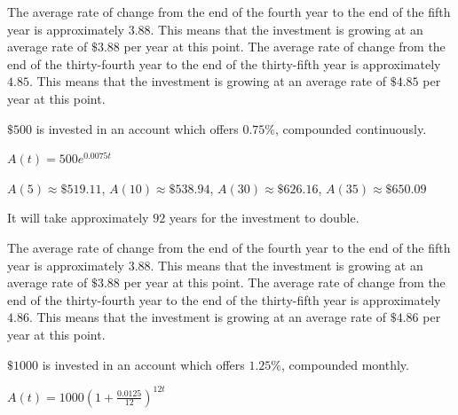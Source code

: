 \documentclass{ximera}
\begin{document}
\begin{question}
\begin{problem}
\begin{solution}
    The average rate of change from the end of the fourth year to the end of the fifth year is approximately $3.88$.  This means that the investment is growing at an average rate of $\$3.88$ per year at this point.  The average rate of change from the end of the thirty-fourth year to the end of the thirty-fifth year is approximately $4.85$.  This means that the investment is growing at an average rate of $\$4.85$ per year at this point. 
\end{solution}
    
\end{problem}

\begin{problem}
    $\$500$ is invested in an account which offers $0.75 \%$, compounded continuously.

\begin{solution}
    $A(t) = 500e^{0.0075t}$ 
\end{solution}

\begin{solution}
    $A(5) \approx \$ 519.11$, $A(10) \approx \$ 538.94$, $A(30) \approx \$ 626.16$, $A(35) \approx \$ 650.09$ 
\end{solution}

\begin{solution}
    It will take approximately $92$ years for the investment to double.
\end{solution}

\begin{solution}
    The average rate of change from the end of the fourth year to the end of the fifth year is approximately $3.88$.  This means that the investment is growing at an average rate of $\$3.88$ per year at this point.  The average rate of change from the end of the thirty-fourth year to the end of the thirty-fifth year is approximately $4.86$.  This means that the investment is growing at an average rate of $\$4.86$ per year at this point. 
\end{solution}
    
\end{problem}

\begin{problem}
    $\$1000$ is invested in an account which offers $1.25 \%$, compounded monthly.

\begin{solution}
    $A(t) = 1000\left(1 + \frac{0.0125}{12}\right)^{12t}$ 
\end{solution}


\end{problem}
\end{question}
\end{document}
